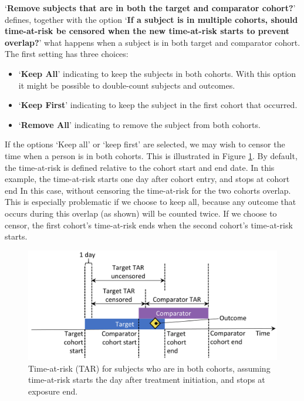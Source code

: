 \documentclass[11pt]{book}
\providecommand{\tightlist}{%
  \setlength{\itemsep}{0pt}\setlength{\parskip}{0pt}}
\begin{document}
`\textbf{Remove subjects that are in both the target and comparator
cohort?}' defines, together with the option `\textbf{If a subject is in
multiple cohorts, should time-at-risk be censored when the new
time-at-risk starts to prevent overlap?}' what happens when a subject is
in both target and comparator cohort. The first setting has three
choices:

\begin{itemize}
\tightlist
\item
  `\textbf{Keep All}' indicating to keep the subjects in both cohorts.
  With this option it might be possible to double-count subjects and
  outcomes.
\item
  `\textbf{Keep First}' indicating to keep the subject in the first
  cohort that occurred.
\item
  `\textbf{Remove All}' indicating to remove the subject from both
  cohorts.
\end{itemize}

If the options `Keep all' or `keep first' are selected, we may wish to
censor the time when a person is in both cohorts. This is illustrated in
Figure \ref{fig:tar}. By default, the time-at-risk is defined relative
to the cohort start and end date. In this example, the time-at-risk
starts one day after cohort entry, and stops at cohort end In this case,
without censoring the time-at-risk for the two cohorts overlap. This is
especially problematic if we choose to keep all, because any outcome
that occurs during this overlap (as shown) will be counted twice. If we
choose to censor, the first cohort's time-at-risk ends when the second
cohort's time-at-risk starts.

\begin{figure}

{\centering \includegraphics[width=0.8\linewidth]{images/PopulationLevelEstimation/tar} 

}

\caption{Time-at-risk (TAR) for subjects who are in both cohorts, assuming time-at-risk starts the day after treatment initiation, and stops at exposure end.}\label{fig:tar}
\end{figure}
\end{document}
